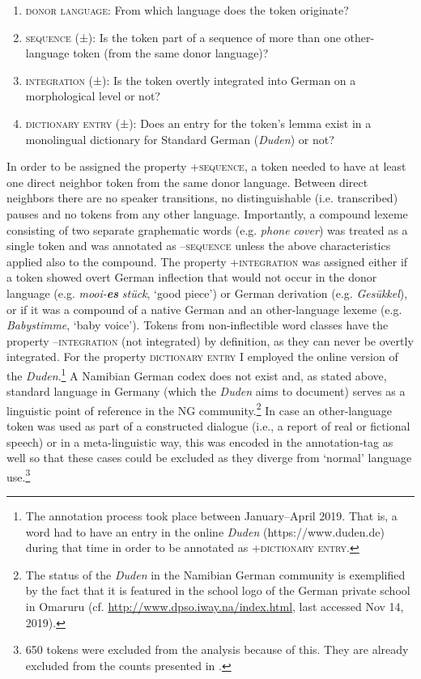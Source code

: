 \documentclass[output=paper]{langsci/langscibook}
\begin{document}
\begin{enumerate}
	\item \textsc{donor} \textsc{language:} From which language does the token originate?
	\item \textsc{sequence} \textsc{(±):} Is the token part of a sequence of more than one other-language token (from the same donor language)?
	\item \textsc{integration} \textsc{(±):} Is the token overtly integrated into German on a morphological level or not?
	\item \textsc{dictionary} \textsc{entry} \textsc{(±):} Does an entry for the token’s lemma exist in a monolingual dictionary for Standard German (\textit{Duden}) or not?
\end{enumerate}
    
In order to be assigned the property \textsc{+sequence,} a token needed to have at least one direct neighbor token from the same donor language. Between direct neighbors there are no speaker transitions, no distinguishable (i.e. transcribed) pauses and no tokens from any other language. Importantly, a compound lexeme consisting of two separate graphematic words (e.g. \textit{phone} \textit{cover}) was treated as a single token and was annotated as –\textsc{sequence} unless the above characteristics applied also to the compound. The property \textsc{+integration} was assigned either if a token showed overt German inflection that would not occur in the donor language (e.g. \textit{mooi-}\textbf{\textit{es}} \textit{stück}, ‘good piece’) or German derivation (e.g. \textit{Gesükkel}), or if it was a compound of a native German and an other-language lexeme (e.g. \textit{Babystimme}, ‘baby voice’). Tokens from non-inflectible word classes have the property –\textsc{integration} (not integrated) by definition, as they can never be overtly integrated. For the property \textsc{dictionary} \textsc{entry} I employed the online version of the \textit{Duden}.\footnote{The annotation process took place between January--April 2019. That is, a word had to have an entry in the online \textit{Duden} (https://www.duden.de) during that time in order to be annotated as +\textsc{dictionary} \textsc{entry}.} A Namibian German codex does not exist and, as stated above, standard language in Germany (which the \textit{Duden} aims to document) serves as a linguistic point of reference in the NG community.\footnote{The status of the \textit{Duden} in the Namibian German community is exemplified by the fact that it is featured in the school logo of the German private school in Omaruru (cf. \url{http://www.dpso.iway.na/index.html}, last accessed Nov 14, 2019).} In case an other-language token was used as part of a constructed dialogue (i.e., a report of real or fictional speech) or in a meta-linguistic way, this was encoded in the annotation-tag as well so that these cases could be excluded as they diverge from ‘normal’ language use.\footnote{650 tokens were excluded from the analysis because of this. They are already excluded from the counts presented in .}
\end{document}
